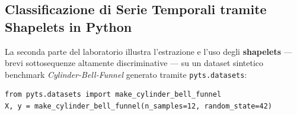 \begin{table}[H]
\centering
\caption{Confronto delle prestazioni sul test set intatto ($10\,990$ record) per i metodi eseguiti su \textit{Adult}.}
\label{tab:dm-lab-adult-summary}
\small
{}
\end{table}

\FloatBarrier
\subsection{Classificazione di Serie Temporali tramite Shapelets in Python}
\label{sec:dm-lab-shapelets}

La seconda parte del laboratorio illustra l'estrazione e l'uso degli \textbf{shapelets} --- brevi sottosequenze altamente discriminative --- su un dataset sintetico benchmark \textit{Cylinder-Bell-Funnel} generato tramite \texttt{pyts.datasets}:

\begin{lstlisting}[style=pythoncode, caption={Generazione del dataset sintetico Cylinder-Bell-Funnel.}]
from pyts.datasets import make_cylinder_bell_funnel
X, y = make_cylinder_bell_funnel(n_samples=12, random_state=42)
\end{lstlisting}

